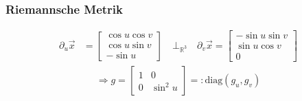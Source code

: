 \documentclass{scrartcl}
\newcommand{\R}{\mathds{R}}
\newcommand{\diag}[1]{\text{diag}\left( #1 \right)}
\begin{document}
    \subsubsection{Riemannsche Metrik}
      \begin{align}
        \partial_{u}\vec{x}
              &=\begin{bmatrix}
                  \cos u \cos v \\
                  \cos u \sin v \\
                  -\sin u
                \end{bmatrix}
              \quad\bot_{\R^{3}}\quad
              \partial_{v}\vec{x}
              =\begin{bmatrix}
                        -\sin u \sin v \\
                        \sin u \cos v \\
                        0
                \end{bmatrix}
      \end{align}
      \begin{align}
        \Rightarrow g = \begin{bmatrix}
              1 & 0 \\ 0 & \sin^{2} u
            \end{bmatrix}
          =: \diag{g_{u}, g_{v}}
      \end{align}
  
\end{document}
